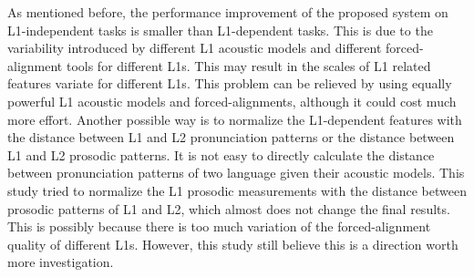 As mentioned before, the performance improvement of the proposed system on L1-independent tasks is smaller than L1-dependent tasks. This is due to the variability introduced by different L1 acoustic models and different forced-alignment tools for different L1s. This may result in the scales of L1 related features variate for different L1s. This problem can be relieved by using equally powerful L1 acoustic models and forced-alignments, although it could cost much more effort. Another possible way is to normalize the L1-dependent features with the distance between L1 and L2 pronunciation patterns or the distance between L1 and L2 prosodic patterns. It is not easy to directly calculate the distance between pronunciation patterns of two language given their acoustic models. This study tried to normalize the L1 prosodic measurements with the distance between prosodic patterns of L1 and L2, which almost does not change the final results. This is possibly because there is too much variation of the forced-alignment quality of different L1s. However, this study still believe this is a direction worth more investigation.
